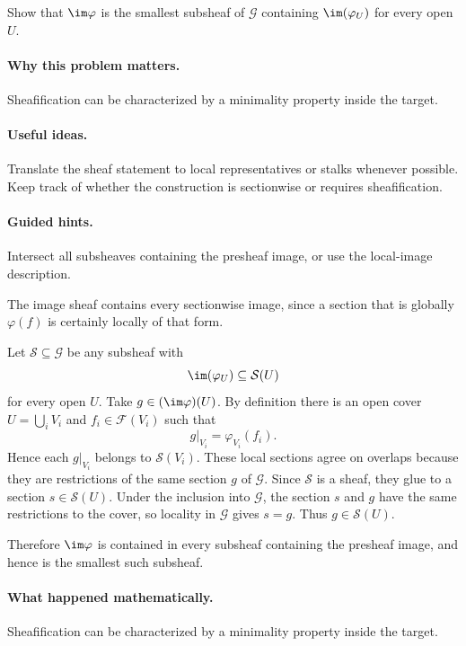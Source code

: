 \begin{problem}\label{prob:vi15-p4}
Show that $\im\varphi$ is the smallest subsheaf of $\mathcal G$ containing $\im(\varphi_U)$ for every open $U$.
\end{problem}

\ifdefined\FullProblemDossiers
\paragraph{Why this problem matters.}
Sheafification can be characterized by a minimality property inside the target.

\paragraph{Useful ideas.}
Translate the sheaf statement to local representatives or stalks whenever possible.  Keep track of whether the construction is sectionwise or requires sheafification.

\paragraph{Guided hints.}
Intersect all subsheaves containing the presheaf image, or use the local-image description.

\begin{solution}
The image sheaf contains every sectionwise image, since a section that is globally $\varphi(f)$ is certainly locally of that form.

Let $\mathcal S\subseteq\mathcal G$ be any subsheaf with
\[
\im(\varphi_U)\subseteq\mathcal S(U)
\]
for every open $U$. Take $g\in(\im\varphi)(U)$. By definition there is an open cover $U=\bigcup_iV_i$ and $f_i\in\mathcal F(V_i)$ such that
\[
g|_{V_i}=\varphi_{V_i}(f_i).
\]
Hence each $g|_{V_i}$ belongs to $\mathcal S(V_i)$. These local sections agree on overlaps because they are restrictions of the same section $g$ of $\mathcal G$. Since $\mathcal S$ is a sheaf, they glue to a section $s\in\mathcal S(U)$. Under the inclusion into $\mathcal G$, the section $s$ and $g$ have the same restrictions to the cover, so locality in $\mathcal G$ gives $s=g$. Thus $g\in\mathcal S(U)$.

Therefore $\im\varphi$ is contained in every subsheaf containing the presheaf image, and hence is the smallest such subsheaf.
\end{solution}

\paragraph{What happened mathematically.}
Sheafification can be characterized by a minimality property inside the target.


